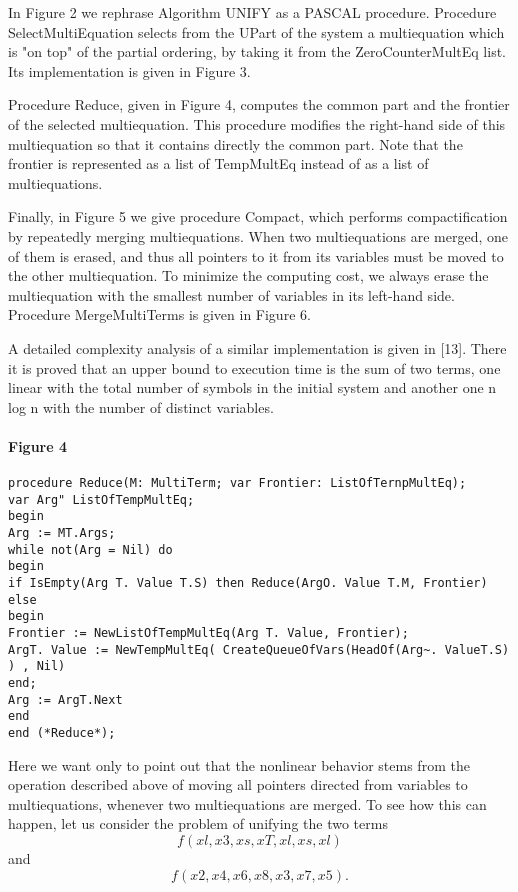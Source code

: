 In Figure 2 we rephrase Algorithm UNIFY as a PASCAL procedure. Procedure
SelectMultiEquation selects from the UPart of the system a multiequation which
is "on top" of the partial ordering, by taking it from the ZeroCounterMultEq list.
Its implementation is given in Figure 3. 

Procedure Reduce, given in Figure 4, computes the common part and the
frontier of the selected multiequation. This procedure modifies the right-hand
side of this multiequation so that it contains directly the common part. Note that
the frontier is represented as a list of TempMultEq instead of as a list of
multiequations. 

Finally, in Figure 5 we give procedure Compact, which performs compactification
by repeatedly merging multiequations. When two multiequations are
merged, one of them is erased, and thus all pointers to it from its variables must
be moved to the other multiequation. To minimize the computing cost, we always
erase the multiequation with the smallest number of variables in its left-hand
side. Procedure MergeMultiTerms is given in Figure 6. 

A detailed complexity analysis of a similar implementation is given in [13].
There it is proved that an upper bound to execution time is the sum of two terms,
one linear with the total number of symbols in the initial system and another one
n log n with the number of distinct variables. 

\paragraph{Figure 4}
\begin{verbatim}
procedure Reduce(M: MultiTerm; var Frontier: ListOfTernpMultEq);
var Arg" ListOfTempMultEq;
begin
Arg := MT.Args;
while not(Arg = Nil) do
begin
if IsEmpty(Arg T. Value T.S) then Reduce(ArgO. Value T.M, Frontier)
else
begin
Frontier := NewListOfTempMultEq(Arg T. Value, Frontier);
ArgT. Value := NewTempMultEq( CreateQueueOfVars(HeadOf(Arg~. ValueT.S) ) , Nil)
end;
Arg := ArgT.Next
end
end (*Reduce*); 
\end{verbatim}

Here we want only to point out that the nonlinear behavior stems from the
operation described above of moving all pointers directed from variables to
multiequations, whenever two multiequations are merged. To see how this can
happen, let us consider the problem of unifying the two terms
\[f(xl, x3, xs, xT, xl, xs, xl)\]
and
\[f(x2, x4, x6, x8, x3, x7, x5).\]

